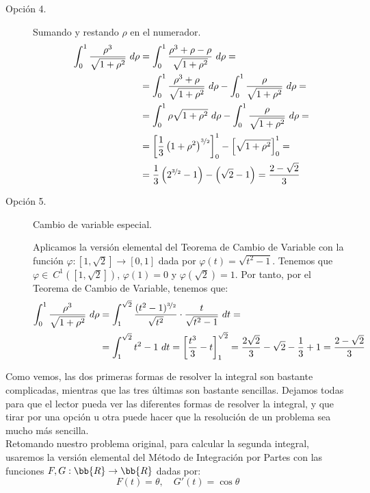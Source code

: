 \begin{ejercicio}
\begin{description}
        \item [Opción 4.] Sumando y restando $\rho$ en el numerador.
        \begin{align*}
            \int_0^1 \dfrac{\rho^3}{\sqrt{1+\rho^2}} ~d\rho &= \int_0^1 \dfrac{\rho^3+\rho-\rho}{\sqrt{1+\rho^2}} ~d\rho =\\
            &= \int_0^1 \dfrac{\rho^3+\rho}{\sqrt{1+\rho^2}} ~d\rho - \int_0^1 \dfrac{\rho}{\sqrt{1+\rho^2}} ~d\rho =\\
            &= \int_0^1 \rho\sqrt{1+\rho^2} ~d\rho - \int_0^1 \dfrac{\rho}{\sqrt{1+\rho^2}} ~d\rho =\\
            &= \left[\dfrac{1}{3}\left(1+\rho^2\right)^{\nicefrac{3}{2}}\right]_0^1 - \left[\sqrt{1+\rho^2}\right]_0^1 =\\
            &= \dfrac{1}{3}\left(2^{\nicefrac{3}{2}}-1\right) - \left(\sqrt{2}-1\right) = \dfrac{2-\sqrt{2}}{3}
        \end{align*}

        \item [Opción 5.] Cambio de variable especial.
        
        Aplicamos la versión elemental del Teorema de Cambio de Variable con la función $\varphi:\left[1,\sqrt{2}\right]\to [0,1]$ dada por $\varphi(t)=\sqrt{t^2-1}$.
        Tenemos que $\varphi\in~C^1\left([1,\sqrt{2}]\right)$, $\varphi(1)=0$ y $\varphi\left(\sqrt{2}\right)=1$. Por tanto, por el Teorema de Cambio de Variable, tenemos que:
        \begin{align*}
            \int_0^1 \dfrac{\rho^3}{\sqrt{1+\rho^2}} ~d\rho &= \int_1^{\sqrt{2}} \dfrac{(t^2-1)^{\nicefrac{3}{2}}}{\sqrt{t^2}}\cdot \dfrac{t}{\sqrt{t^2-1}}~dt =\\
            &= \int_1^{\sqrt{2}} t^2-1 ~dt
            = \left[\dfrac{t^3}{3}-t\right]_1^{\sqrt{2}} = \dfrac{2\sqrt{2}}{3}-\sqrt{2}-\dfrac{1}{3}+1 = \dfrac{2-\sqrt{2}}{3}
        \end{align*}
    \end{description}
    Como vemos, las dos primeras formas de resolver la integral son bastante complicadas, mientras que las tres últimas son bastante sencillas. Dejamos todas para que el lector pueda ver las diferentes formas de resolver la integral, y que tirar por una opción u otra puede hacer que la resolución de un problema sea mucho más sencilla.\\

    Retomando nuestro problema original, para calcular la segunda integral, usaremos la versión elemental del Método de Integración por Partes con las funciones $F,G:\bb{R}\to \bb{R}$ dadas por:
    \begin{equation*}
        F(t) = \theta, \quad G'(t) = \cos\theta
    \end{equation*}


\end{ejercicio}
